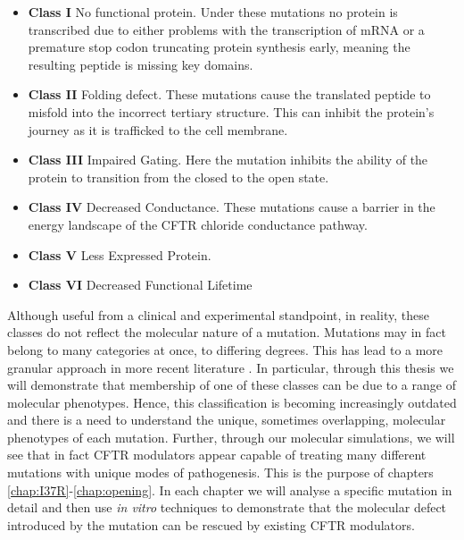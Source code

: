\begin{itemize}

	\item \textbf{Class I} No functional protein. Under these mutations no protein is transcribed due to either problems with the transcription of mRNA or a premature stop codon truncating protein synthesis early, meaning the resulting peptide is missing key domains. 
	\item \textbf{Class II} Folding defect. These mutations cause the translated peptide to misfold into the incorrect tertiary structure. This can inhibit the protein's journey as it is trafficked to the cell membrane. 
	\item \textbf{Class III} Impaired Gating. Here the mutation inhibits the ability of the protein to transition from the closed to the open state. 
	\item \textbf{Class IV} Decreased Conductance. These mutations cause a barrier in the energy landscape of the CFTR chloride conductance pathway.
	\item \textbf{Class V} Less Expressed Protein.  
	\item \textbf{Class VI} Decreased Functional Lifetime

\end{itemize}

Although useful from a clinical and experimental standpoint, in reality, these classes do not reflect the molecular nature of a mutation. Mutations may in fact belong to many categories at once, to differing degrees. This has lead to a more granular approach in more recent literature \cite{veit2016}. In particular, through this thesis we will demonstrate that membership of one of these classes can be due to a range of molecular phenotypes. Hence, this classification is becoming increasingly outdated and there is a need to understand the unique, sometimes overlapping, molecular phenotypes of each mutation. Further, through our molecular simulations, we will see that in fact CFTR modulators appear capable of treating many different mutations with unique modes of pathogenesis. This is the purpose of chapters \ref{chap:I37R}-\ref{chap:opening}. In each chapter we will analyse a specific mutation in detail and then use \textit {in vitro} techniques to demonstrate that the molecular defect introduced by the mutation can be rescued by existing CFTR modulators. 

